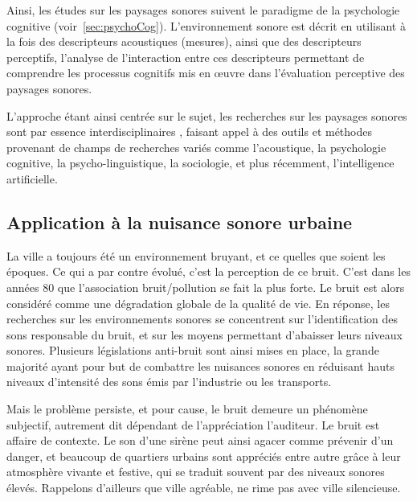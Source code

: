 Ainsi, les études sur les paysages sonores suivent le paradigme de la psychologie cognitive \citep{dubois2006cognitive,maffiolo_caracterisation_1999} (voir~\ref{sec:psychoCog}). L'environnement sonore est décrit en utilisant à la fois des descripteurs acoustiques (mesures), ainsi que des descripteurs perceptifs, l'analyse de l'interaction entre ces descripteurs permettant de comprendre les processus cognitifs mis en œuvre dans l'évaluation perceptive des paysages sonores.

L'approche étant ainsi centrée sur le sujet, les recherches sur les paysages sonores sont par essence interdisciplinaires \citep{davies2013perception,aletta2016soundscape}, faisant appel à des outils et méthodes provenant de champs de recherches variés comme l'acoustique, la psychologie cognitive, la psycho-linguistique, la sociologie, et plus récemment, l’intelligence artificielle.

\subsection{Application à la nuisance sonore urbaine}

La ville a toujours été un environnement bruyant, et ce quelles que soient les époques. Ce qui a par contre évolué, c'est la perception de ce bruit. C'est dans les années 80 que l'association bruit/pollution se fait la plus forte. Le bruit est alors considéré comme une dégradation globale de la qualité de vie. En réponse, les recherches sur les environnements sonores se concentrent sur l'identification des sons responsable du bruit, et sur les moyens permettant d'abaisser leurs niveaux sonores. Plusieurs législations anti-bruit sont ainsi mises en place, la grande majorité ayant pour but de combattre les nuisances sonores en réduisant hauts niveaux d'intensité des sons émis par l'industrie ou les transports.

Mais le problème persiste, et pour cause, le bruit demeure un phénomène subjectif, autrement dit dépendant de l'appréciation l'auditeur. Le bruit est affaire de contexte. Le son d'une sirène peut ainsi agacer comme prévenir d'un danger, et beaucoup de quartiers urbains sont appréciés entre autre grâce à leur atmosphère vivante et festive, qui se traduit souvent par des niveaux sonores élevés. Rappelons d'ailleurs que ville agréable, ne rime pas avec ville silencieuse.  


